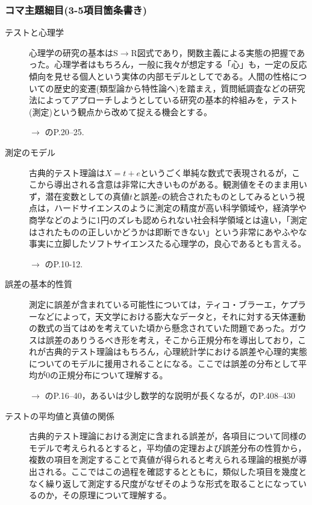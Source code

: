 \subsubsection{コマ主題細目(3-5項目箇条書き)}
\begin{description}
\item[テストと心理学]心理学の研究の基本はS$\to$R図式であり，関数主義による実態の把握であった。心理学者はもちろん，一般に我々が想定する「心」も，一定の反応傾向を見せる個人という実体の内部モデルとしてである。人間の性格についての歴史的変遷(類型論から特性論へ)を踏まえ，質問紙調査などの研究法によってアプローチしようとしている研究の基本的枠組みを，テスト(測定)という観点から改めて捉える機会とする。
\begin{flushright}
    $\to$ \citet{kosugi2016b}のP.20--25.
\end{flushright}

\item[測定のモデル]古典的テスト理論は$X=t+e$というごく単純な数式で表現されるが，ここから導出される含意は非常に大きいものがある。観測値をそのまま用いず，潜在変数としての真値$t$と誤差$e$の統合されたものとしてみるという視点は，ハードサイエンスのように測定の精度が高い科学領域や，経済学や商学などのように1円のズレも認められない社会科学領域とは違い，「測定はされたものの正しいかどうかは即断できない」という非常にあやふやな事実に立脚したソフトサイエンスたる心理学の，良心であるとも言える。
\begin{flushright}
    $\to$ \citet{熊谷201508}のP.10-12.
\end{flushright}

\item[誤差の基本的性質]測定に誤差が含まれている可能性については，ティコ・ブラーエ，ケプラーなどによって，天文学における膨大なデータと，それに対する天体運動の数式の当てはめを考えていた頃から懸念されていた問題であった。ガウスは誤差のありうるべき形を考え，そこから正規分布を導出しており，これが古典的テスト理論はもちろん，心理統計学における誤差や心理的実態についてのモデルに援用されることになる。ここでは誤差の分布として平均が0の正規分布について理解する。
\begin{flushright}
    $\to$ \citet{長沼201611}のP.16--40，あるいは少し数学的な説明が長くなるが，\citet{西内201712}のP.408--430
\end{flushright}

\item[テストの平均値と真値の関係]古典的テスト理論における測定に含まれる誤差が，各項目について同様のモデルで考えられるとすると，平均値の定理および誤差分布の性質から，複数の項目を測定することで真値が得られると考えられる理論的根拠が導出される。ここではこの過程を確認するとともに，類似した項目を幾度となく繰り返して測定する尺度がなぜそのような形式を取ることになっているのか，その原理について理解する。


\end{description}
